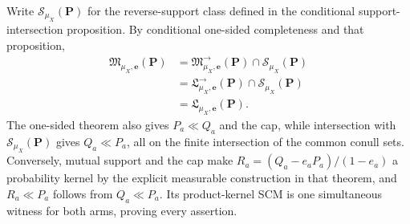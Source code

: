 Write \(\mathcal S_{\mu_X}(\boldsymbol P)\) for the reverse-support class defined in the conditional support-intersection proposition.  By conditional one-sided completeness and that proposition,
\[
\begin{aligned}
 \mathfrak M_{\mu_X,\boldsymbol e}(\boldsymbol P)
 &=\mathfrak M^{\to}_{\mu_X,\boldsymbol e}(\boldsymbol P)\cap\mathcal S_{\mu_X}(\boldsymbol P)\\
 &=\mathfrak L^{\to}_{\mu_X,\boldsymbol e}(\boldsymbol P)\cap\mathcal S_{\mu_X}(\boldsymbol P)\\
 &=\mathfrak L_{\mu_X,\boldsymbol e}(\boldsymbol P).
\end{aligned}
\]
The one-sided theorem also gives \(P_a\ll Q_a\) and the cap, while intersection with \(\mathcal S_{\mu_X}(\boldsymbol P)\) gives \(Q_a\ll P_a\), all on the finite intersection of the common conull sets.  Conversely, mutual support and the cap make \(R_a=(Q_a-e_aP_a)/(1-e_a)\) a probability kernel by the explicit measurable construction in that theorem, and \(R_a\ll P_a\) follows from \(Q_a\ll P_a\).  Its product-kernel SCM is one simultaneous witness for both arms, proving every assertion.